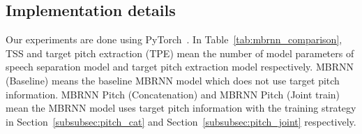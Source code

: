 \begin{table*}[!htbp]
    \centering
    \caption{Results comparison between different training strategies and the baseline with MBRNN and VoiceFilter model. ``Before" means the SDR value of the mixed utterance, ``After" means the SDR value of the estimated speech.}
    \label{tab:mbrnn_comparison}
\end{table*}

\subsection{Implementation details}
\label{subsec:implement}

Our experiments are done using PyTorch~\cite{NEURIPS2019_bdbca288}.
In Table~\ref{tab:mbrnn_comparison}, TSS and target pitch extraction (TPE) mean the number of model parameters of speech separation model and target pitch extraction model respectively.
MBRNN (Baseline) means the baseline MBRNN model which does not use target pitch information. MBRNN Pitch (Concatenation) and MBRNN Pitch (Joint train) mean the MBRNN model uses target pitch information with the training strategy in Section~\ref{subsubsec:pitch_cat} and Section~\ref{subsubsec:pitch_joint} respectively.

